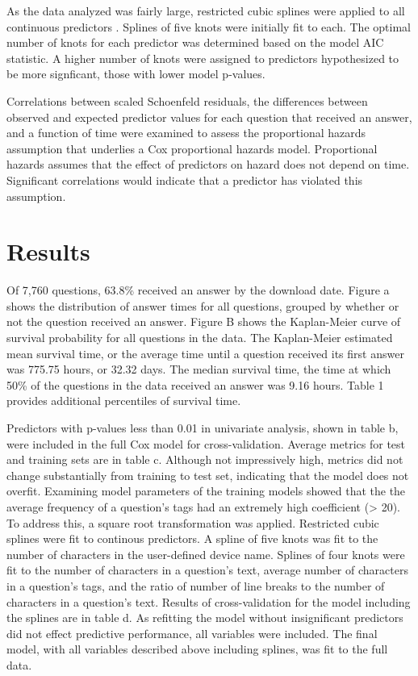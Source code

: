 \documentclass[12pt]{article}
\begin{document}
As the data analyzed was fairly large, restricted cubic splines were applied to all continuous predictors \citep{Harrell2015}. Splines of five knots were initially fit to each. The optimal number of knots for each predictor was determined based on the model AIC statistic. A higher number of knots were assigned to predictors hypothesized to be more signficant, those with lower model p-values.

Correlations between scaled Schoenfeld residuals, the differences between observed and expected predictor values for each question that received an answer, and a function of time were examined to assess the proportional hazards assumption that underlies a Cox proportional hazards model. Proportional hazards assumes that the effect of predictors on hazard does not depend on time. Significant correlations would indicate that a predictor has violated this assumption. 


\section{Results} 

  Of 7,760 questions, 63.8\% received an answer by the download date. Figure a shows the distribution of answer times for all questions, grouped by whether or not the question received an answer. Figure B shows the Kaplan-Meier curve of survival probability for all questions in the data. The Kaplan-Meier estimated mean survival time, or the average time until a question received its first answer was 775.75 hours, or 32.32 days. The median survival time, the time at which 50\% of the questions in the data received an answer was 9.16 hours. Table 1 provides additional percentiles of survival time. 

Predictors with p-values less than 0.01 in univariate analysis, shown in table b, were included in the full Cox model for cross-validation. Average metrics for test and training sets are in table c. Although not impressively high, metrics did not change substantially from training to test set, indicating that the model does not overfit. Examining model parameters of the training models showed that the the average frequency of a question's tags had an extremely high coefficient (> 20). To address this, a square root transformation was applied. Restricted cubic splines were fit to continous predictors. A spline of five knots was fit to the number of characters in the user-defined device name. Splines of four knots were fit to the number of characters in a question's text, average number of characters in a question's tags, and the ratio of number of line breaks to the number of characters in a question's text. Results of cross-validation for the model including the splines are in table d. As refitting the model without insignificant predictors did not effect predictive performance, all variables were included. The final model, with all variables described above including splines, was fit to the full data.  
\end{document}
